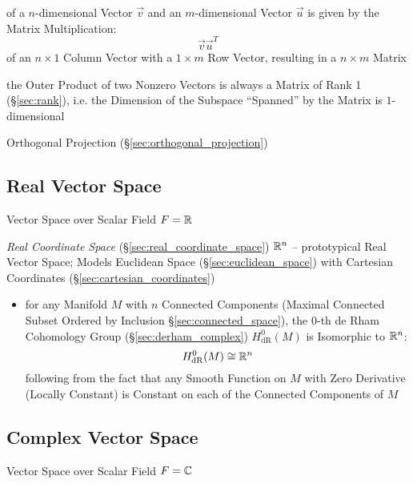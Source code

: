 of a $n$-dimensional Vector $\vec{v}$ and an $m$-dimensional Vector $\vec{u}$ is
given by the Matrix Multiplication:
\[
  \vec{v}\vec{u}^T
\]
of an $n \times 1$ Column Vector with a $1 \times m$ Row Vector, resulting in a
$n \times m$ Matrix

the Outer Product of two Nonzero Vectors is always a Matrix of Rank 1
(\S\ref{sec:rank}), i.e. the Dimension of the Subspace ``Spanned'' by the Matrix
is $1$-dimensional

\fist Orthogonal Projection (\S\ref{sec:orthogonal_projection})



\subsection{Real Vector Space}\label{sec:real_vector_space}

Vector Space over Scalar Field $F = \mathbb{R}$

\fist \emph{Real Coordinate Space} (\S\ref{sec:real_coordinate_space})
$\mathbb{R}^n$ -- prototypical Real Vector Space; Models Euclidean Space
(\S\ref{sec:euclidean_space}) with Cartesian Coordinates
(\S\ref{sec:cartesian_coordinates})

\begin{itemize}
  \item for any Manifold $M$ with $n$ Connected Components (Maximal Connected
    Subset Ordered by Inclusion \S\ref{sec:connected_space}), the $0$-th de Rham
    Cohomology Group (\S\ref{sec:derham_complex}) $H_{\mathrm{dR}}^0(M)$ is
    Isomorphic to $\mathbb{R}^n$:
    \[
      H_{\mathrm{dR}}^0(M) \cong \mathbb{R}^n
    \]
    following from the fact that any Smooth Function on $M$ with Zero Derivative
    (Locally Constant) is Constant on each of the Connected Components of $M$
\end{itemize}


\subsection{Complex Vector Space}\label{sec:complex_vector_space}

Vector Space over Scalar Field $F = \mathbb{C}$



